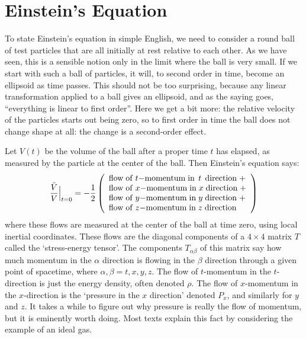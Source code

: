 \section{Einstein's Equation}

To state Einstein's equation in simple English, we need to consider a
round ball of test particles that are all initially at
rest relative to each other.  As we have seen, this is a sensible
notion only in the limit where the ball is very small. If we start with
such a ball of particles, it will, to second order in
time, become an ellipsoid as time passes.  This should not be too
surprising, because any linear transformation applied to a ball gives an
ellipsoid, and as the saying goes, ``everything is linear to first
order''.  Here we get a bit more: the relative velocity of the particles
starts out being zero, so to first order in time the ball does not
change shape at all: the change is a second-order effect.

Let $V(t)$ be the volume of the ball after a proper time $t$ has
elapsed, as measured by the particle at the center of the ball.  Then
Einstein's equation says: 
\[ {\ddot V\over V} \Bigr|_{t = 0} =
 -{1\over 2} \left( \begin{array}{l} 
{\rm flow \; of \;} t{\rm -momentum \; in \;\,} t {\rm \,\; direction \;} + \\ 
{\rm flow \; of \;} x{\rm -momentum \; in \;} x {\rm \; direction \;} + \\ 
{\rm flow \; of \;} y{\rm -momentum \; in \;} y {\rm \; direction \;} + \\ 
{\rm flow \; of \;} z{\rm -momentum \; in \;} z {\rm \; direction} 
\end{array} \right) \] 
where these flows are measured at the center of the ball at time zero,
using local inertial coordinates.  These flows are the diagonal
components of a $4 \times 4$ matrix $T$ called the `stress-energy
tensor'.  The components $T_{\alpha \beta}$ of this matrix say how much
momentum in the $\alpha$ direction is flowing in the $\beta$ direction
through a given point of spacetime, where $\alpha,\beta = t,x,y,z$.  The
flow of $t$-momentum in the $t$-direction is just the energy density,
often denoted $\rho$.  The flow of $x$-momentum in the $x$-direction is
the `pressure in the $x$ direction' denoted $P_x$, and similarly for $y$
and $z$.  It takes a while to figure out why pressure is really the flow
of momentum, but it is eminently worth doing.  Most texts explain this
fact by considering the example of an ideal gas.

